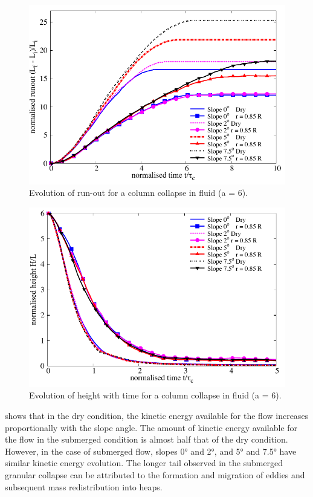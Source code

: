 \documentclass[epj,twocolumn]{webofc}
\begin{document}
\begin{figure}[tbph]
\centering
\includegraphics[width=0.95\linewidth]{figs/runout_a6_slope}
\caption{Evolution of run-out for a column collapse in fluid (a = 6).}
\label{fig:Runout_a6_slope}
\end{figure}

\begin{figure}[tbph]
\centering
\includegraphics[width=\linewidth]{figs/height_a6_slope}
\caption{Evolution of height with time for a column collapse in fluid (a = 6).}
\label{fig:Height_a6_slope}
\end{figure}

 shows that in the dry condition, the kinetic energy
available for the flow increases proportionally with the slope angle. The 
amount of kinetic energy available for the flow in the submerged condition 
is almost half that of the dry condition. However,
in the case of submerged flow, slopes 0\si{\degree} and 2\si{\degree},
and 5\si{\degree} and 7.5\si{\degree} have similar kinetic energy evolution.
The longer tail observed in the submerged granular collapse can be attributed to
the formation and migration of eddies and subsequent mass redistribution into heaps.
\end{document}
